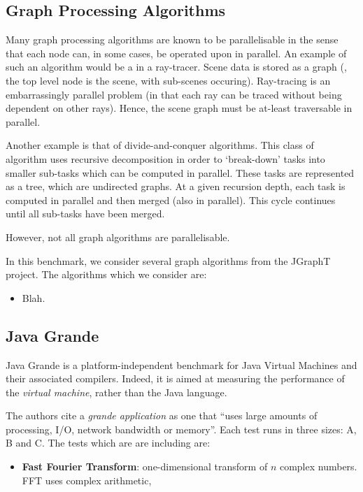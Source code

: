 	\subsection{Graph Processing Algorithms} \label{sec:methodology/benchmarks/graphs}
	Many graph processing algorithms are known to be parallelisable in the sense that each node can, in some cases, be operated upon in parallel. An example of such an algorithm would be a in a ray-tracer. Scene data is stored as a graph (\eg, the top level node is the scene, with sub-scenes occuring). Ray-tracing is an embarrassingly parallel problem (in that each ray can be traced without being dependent on other rays). Hence, the scene graph must be at-least traversable in parallel.
	
	Another example is that of divide-and-conquer algorithms. This class of algorithm uses recursive decomposition in order to `break-down' tasks into smaller sub-tasks which can be computed in parallel. These tasks are represented as a tree, which are undirected graphs. At a given recursion depth, each task is computed in parallel and then merged (also in parallel). This cycle continues until all sub-tasks have been merged.
	
	However, not all graph algorithms are parallelisable.
	
	In this benchmark, we consider several graph algorithms from the JGraphT project. The algorithms which we consider are:
	
	\begin{itemize}
		\item Blah.
	\end{itemize}
	
	\subsection{Java Grande} \label{sec:methodology/benchmarks/grande}
	Java Grande \citep{Smith2001,Bull2001} is a platform-independent benchmark for Java Virtual Machines and their associated compilers. Indeed, it is aimed at measuring the performance of the \emph{virtual machine}, rather than the Java language.
	
	The authors cite a \textit{grande application} as one that ``uses large amounts of processing, I/O, network bandwidth or memory''.
	Each test runs in three sizes: A, B and C. The tests which are are including are:
	
	\begin{itemize}
		\item \textbf{Fast Fourier Transform}: one-dimensional transform of $n$ complex numbers. FFT uses complex arithmetic, 
	\end{itemize}
	
